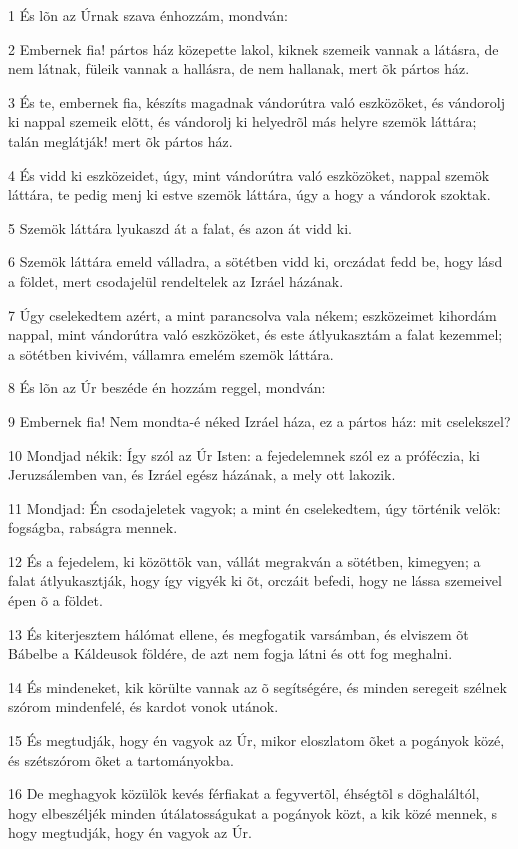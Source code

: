 \par 1 És lõn az Úrnak szava énhozzám, mondván:
\par 2 Embernek fia! pártos ház közepette lakol, kiknek szemeik vannak a látásra, de nem látnak, füleik vannak a hallásra, de nem hallanak, mert õk pártos ház.
\par 3 És te, embernek fia, készíts magadnak vándorútra való eszközöket, és vándorolj ki nappal szemeik elõtt, és vándorolj ki helyedrõl más helyre szemök láttára; talán meglátják! mert õk pártos ház.
\par 4 És vidd ki eszközeidet, úgy, mint vándorútra való eszközöket, nappal szemök láttára, te pedig menj ki estve szemök láttára, úgy a hogy a vándorok szoktak.
\par 5 Szemök láttára lyukaszd át a falat, és azon át vidd ki.
\par 6 Szemök láttára emeld válladra, a sötétben vidd ki, orczádat fedd be, hogy lásd a földet, mert csodajelül rendeltelek az Izráel házának.
\par 7 Úgy cselekedtem azért, a mint parancsolva vala nékem; eszközeimet kihordám nappal, mint vándorútra való eszközöket, és este átlyukasztám a falat kezemmel; a sötétben kivivém, vállamra emelém szemök láttára.
\par 8 És lõn az Úr beszéde én hozzám reggel, mondván:
\par 9 Embernek fia! Nem mondta-é néked Izráel háza, ez a pártos ház: mit cselekszel?
\par 10 Mondjad nékik: Így szól az Úr Isten: a fejedelemnek szól ez a próféczia, ki Jeruzsálemben van, és Izráel egész házának, a mely ott lakozik.
\par 11 Mondjad: Én csodajeletek vagyok; a mint én cselekedtem, úgy történik velök: fogságba, rabságra mennek.
\par 12 És a fejedelem, ki közöttök van, vállát megrakván a sötétben, kimegyen; a falat átlyukasztják, hogy így vigyék ki õt, orczáit befedi, hogy ne lássa szemeivel épen õ a földet.
\par 13 És kiterjesztem hálómat ellene, és megfogatik varsámban, és elviszem õt Bábelbe a Káldeusok földére, de azt nem fogja látni és ott fog meghalni.
\par 14 És mindeneket, kik körülte vannak az õ segítségére, és minden seregeit szélnek szórom mindenfelé, és kardot vonok utánok.
\par 15 És megtudják, hogy én vagyok az Úr, mikor eloszlatom õket a pogányok közé, és szétszórom õket a tartományokba.
\par 16 De meghagyok közülök kevés férfiakat a fegyvertõl, éhségtõl s döghaláltól, hogy elbeszéljék minden útálatosságukat a pogányok közt, a kik közé mennek, s hogy megtudják, hogy én vagyok az Úr.
